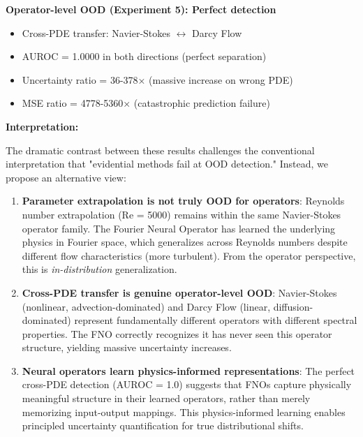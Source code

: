 \textbf{Operator-level OOD (Experiment 5): Perfect detection}
\begin{itemize}
\item Cross-PDE transfer: Navier-Stokes $\leftrightarrow$ Darcy Flow
\item AUROC = 1.0000 in both directions (perfect separation)
\item Uncertainty ratio = 36-378× (massive increase on wrong PDE)
\item MSE ratio = 4778-5360× (catastrophic prediction failure)
\end{itemize}

\textbf{Interpretation:}

The dramatic contrast between these results challenges the conventional interpretation that "evidential methods fail at OOD detection." Instead, we propose an alternative view:

\begin{enumerate}
\item \textbf{Parameter extrapolation is not truly OOD for operators}: Reynolds number extrapolation (Re = 5000) remains within the same Navier-Stokes operator family. The Fourier Neural Operator has learned the underlying physics in Fourier space, which generalizes across Reynolds numbers despite different flow characteristics (more turbulent). From the operator perspective, this is \textit{in-distribution} generalization.

\item \textbf{Cross-PDE transfer is genuine operator-level OOD}: Navier-Stokes (nonlinear, advection-dominated) and Darcy Flow (linear, diffusion-dominated) represent fundamentally different operators with different spectral properties. The FNO correctly recognizes it has never seen this operator structure, yielding massive uncertainty increases.

\item \textbf{Neural operators learn physics-informed representations}: The perfect cross-PDE detection (AUROC = 1.0) suggests that FNOs capture physically meaningful structure in their learned operators, rather than merely memorizing input-output mappings. This physics-informed learning enables principled uncertainty quantification for true distributional shifts.
\end{enumerate}

